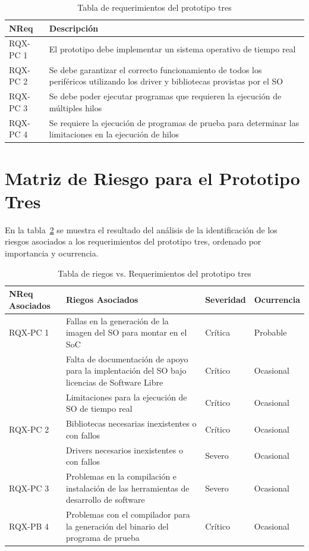 		\begin{table}[h!]
		\centering		
		\begin{tabular}{ p{2.5cm} p{14.5cm}}
		\hline 
		\rowcolor[gray]{0.8} N\textordmasculine Req & Descripción\\
		\hline 
		RQX-PC 1 & El prototipo debe implementar un sistema operativo de tiempo real\\ 
		\hline 
		RQX-PC 2 & Se debe garantizar el correcto funcionamiento de todos los periféricos utilizando los driver y bibliotecas provistas por el SO \\ 
		\hline 
		RQX-PC 3 & Se debe poder ejecutar programas que requieren la ejecución de múltiples hilos  \\ 
		\hline
		RQX-PC 4 & Se requiere la ejecución de programas de prueba para determinar las limitaciones en la ejecución de hilos \\ 
		\hline		
		\end{tabular}
		\caption{Tabla de requerimientos del prototipo tres}
		\label{tab:tdr3}
		\end{table}
\newpage		

		\section{Matriz de Riesgo para el Prototipo Tres} 
En la tabla~\ref{tab:riegos3} se muestra el resultado del análisis de la identificación de los riesgos asociados a los requerimientos del prototipo tres, ordenado por importancia y ocurrencia.
		\begin{table}[h!]
		\centering
		\begin{tabular}{ p{2.5cm} p{9cm} p{1.5cm} p{2cm} }
		\hline 
		\rowcolor[gray]{0.8} N\textordmasculine Req Asociados& Riegos Asociados & Severidad  & Ocurrencia \\
		\hline
		RQX-PC 1& Fallas en la generación de la imagen del SO para montar en el SoC & Crítica       & Probable \\
		\hline				
				& Falta de documentación de apoyo para la implentación del SO bajo licencias de Software Libre & Crítico & Ocasional\\	
		\hline				
				 & Limitaciones para la ejecución de SO de tiempo real & Crítico & Ocasional\\	
 		
 		\hline	
		RQX-PC 2 	& Bibliotecas necesarias inexistentes o con fallos& Crítico & Ocasional\\	
		
		\hline				
 					 & Drivers necesarios inexistentes o con fallos  & Severo  &  Ocasional\\ 
		\hline	
 		RQX-PC 3	&Problemas en la compilación e instalación de las herramientas de desarrollo de software& Severo  &  Ocasional\\ 
		\hline
		RQX-PB 4 & Problemas con el compilador para la generación del binario del programa de prueba  & Crítico&  Ocasional\\
		\hline
		\end{tabular}
		\caption{Tabla de riegos vs. Requerimientos del prototipo tres}
		\label{tab:riegos3}
		\end{table}

